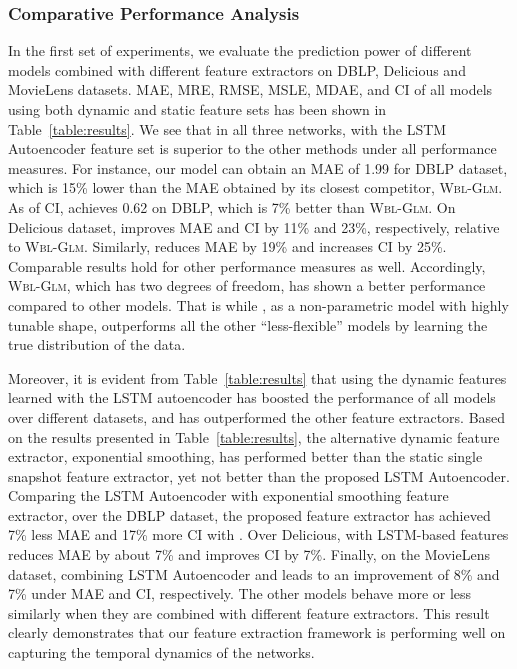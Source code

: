 \subsubsection{Comparative Performance Analysis}
In the first set of experiments, we evaluate the prediction power of different models combined with different feature extractors on DBLP, Delicious and MovieLens datasets. MAE, MRE, RMSE, MSLE, MDAE, and CI of all models using both dynamic and static feature sets has been shown in Table~\ref{table:results}. We see that in all three networks, \npglm with the LSTM Autoencoder feature set is superior to the other methods under all performance measures. For instance, our model \npglm can obtain an MAE of 1.99 for DBLP dataset, which is 15\% lower than the MAE obtained by its closest competitor, \textsc{Wbl-Glm}. As of CI, \npglm achieves 0.62 on DBLP, which is 7\% better than \textsc{Wbl-Glm}. On Delicious dataset, \npglm improves MAE and CI by 11\% and 23\%, respectively, relative to \textsc{Wbl-Glm}. Similarly, \npglm reduces MAE by 19\% and increases CI by 25\%. Comparable results hold for other performance measures as well. Accordingly, \textsc{Wbl-Glm}, which has two degrees of freedom, has shown a better performance compared to other models. That is while \npglm, as a non-parametric model with highly tunable shape, outperforms all the other ``less-flexible'' models by learning the true distribution of the data.

Moreover, it is evident from Table~\ref{table:results} that using the dynamic features learned with the LSTM autoencoder has boosted the performance of all models over different datasets, and has outperformed the other feature extractors. Based on the results presented in Table~\ref{table:results}, the alternative dynamic feature extractor, exponential smoothing, has performed better than the static single snapshot feature extractor, yet not better than the proposed LSTM Autoencoder. Comparing the LSTM Autoencoder with exponential smoothing feature extractor, over the DBLP dataset, the proposed feature extractor has achieved 7\% less MAE and 17\% more CI with \npglm. Over Delicious, \npglm with LSTM-based features reduces MAE by about 7\% and improves CI by 7\%. Finally, on the MovieLens dataset, combining LSTM Autoencoder and \npglm leads to an improvement of 8\% and 7\% under MAE and CI, respectively. The other models behave more or less similarly when they are combined with different feature extractors. This result clearly demonstrates that our feature extraction framework is performing well on capturing the temporal dynamics of the networks.

